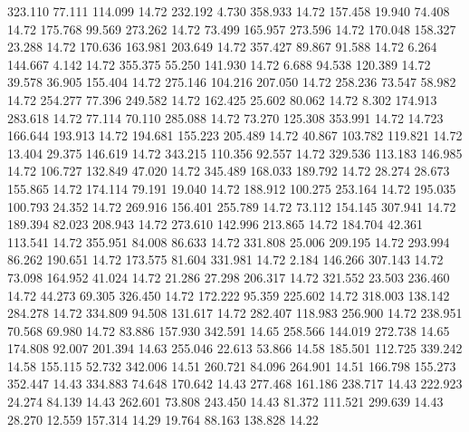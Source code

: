  323.110   77.111  114.099        14.72
 232.192    4.730  358.933        14.72
 157.458   19.940   74.408        14.72
 175.768   99.569  273.262        14.72
  73.499  165.957  273.596        14.72
 170.048  158.327   23.288        14.72
 170.636  163.981  203.649        14.72
 357.427   89.867   91.588        14.72
   6.264  144.667    4.142        14.72
 355.375   55.250  141.930        14.72
   6.688   94.538  120.389        14.72
  39.578   36.905  155.404        14.72
 275.146  104.216  207.050        14.72
 258.236   73.547   58.982        14.72
 254.277   77.396  249.582        14.72
 162.425   25.602   80.062        14.72
   8.302  174.913  283.618        14.72
  77.114   70.110  285.088        14.72
  73.270  125.308  353.991        14.72
  14.723  166.644  193.913        14.72
 194.681  155.223  205.489        14.72
  40.867  103.782  119.821        14.72
  13.404   29.375  146.619        14.72
 343.215  110.356   92.557        14.72
 329.536  113.183  146.985        14.72
 106.727  132.849   47.020        14.72
 345.489  168.033  189.792        14.72
  28.274   28.673  155.865        14.72
 174.114   79.191   19.040        14.72
 188.912  100.275  253.164        14.72
 195.035  100.793   24.352        14.72
 269.916  156.401  255.789        14.72
  73.112  154.145  307.941        14.72
 189.394   82.023  208.943        14.72
 273.610  142.996  213.865        14.72
 184.704   42.361  113.541        14.72
 355.951   84.008   86.633        14.72
 331.808   25.006  209.195        14.72
 293.994   86.262  190.651        14.72
 173.575   81.604  331.981        14.72
   2.184  146.266  307.143        14.72
  73.098  164.952   41.024        14.72
  21.286   27.298  206.317        14.72
 321.552   23.503  236.460        14.72
  44.273   69.305  326.450        14.72
 172.222   95.359  225.602        14.72
 318.003  138.142  284.278        14.72
 334.809   94.508  131.617        14.72
 282.407  118.983  256.900        14.72
 238.951   70.568   69.980        14.72
  83.886  157.930  342.591        14.65
 258.566  144.019  272.738        14.65
 174.808   92.007  201.394        14.63
 255.046   22.613   53.866        14.58
 185.501  112.725  339.242        14.58
 155.115   52.732  342.006        14.51
 260.721   84.096  264.901        14.51
 166.798  155.273  352.447        14.43
 334.883   74.648  170.642        14.43
 277.468  161.186  238.717        14.43
 222.923   24.274   84.139        14.43
 262.601   73.808  243.450        14.43
  81.372  111.521  299.639        14.43
  28.270   12.559  157.314        14.29
  19.764   88.163  138.828        14.22
